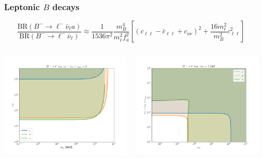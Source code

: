 \documentclass[mathserif, 10pt, aspectratio=169]{beamer}
\begin{document}
\begin{frame}\frametitle{Leptonic $B$ decays}
    $$\frac{\mathrm{BR}(B^-\to \ell^- \bar{\nu}_\ell a)}{\mathrm{BR}(B^-\to \ell^- \bar{\nu}_\ell)} \approx \frac{1}{1536\pi^2}\frac{m_B^4}{m_\ell^2 f_a^2}\left[(c_{\ell\ell}-\bar{c}_{\ell\ell}+c_{\nu\nu})^2+\frac{16 m_\ell^2}{m_B^2} c_{\ell\ell}^2\right]$$

    \begin{columns}
        \begin{column}{0.45\textwidth}
            \includegraphics[width=\columnwidth]{figures/limcl.png}
        \end{column}
        \begin{column}{0.45\textwidth}
            \includegraphics[width=\columnwidth]{figures/lim_c_1GeV.png}
        \end{column}
    \end{columns}
\end{frame}
\end{document}
